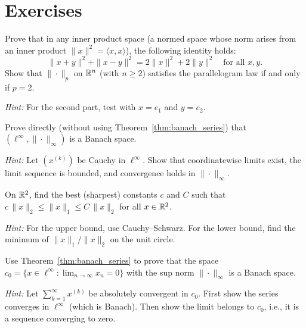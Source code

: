 \documentclass[11pt,a4paper]{article}
\begin{document}

\section{Exercises}
\label{sec:exercises}

\begin{exercise}
\label{ex:parallelogram}
Prove that in any inner product space (a normed space whose norm arises from
an inner product $\|x\|^2 = \langle x, x \rangle$), the following identity
holds:
\[
\|x + y\|^2 + \|x - y\|^2 = 2\|x\|^2 + 2\|y\|^2
\quad \text{for all } x, y.
\]
Show that $\|\cdot\|_p$ on $\mathbb{R}^n$ (with $n \ge 2$) satisfies the
parallelogram law if and only if $p = 2$.

\emph{Hint:} For the second part, test with $x = e_1$ and $y = e_2$.
\end{exercise}

\begin{exercise}
\label{ex:ell_inf_complete}
Prove directly (without using Theorem~\ref{thm:banach_series}) that
$(\ell^\infty, \|\cdot\|_\infty)$ is a Banach space.

\emph{Hint:} Let $(x^{(k)})$ be Cauchy in $\ell^\infty$. Show that
coordinatewise limits exist, the limit sequence is bounded, and convergence
holds in $\|\cdot\|_\infty$.
\end{exercise}

\begin{exercise}
\label{ex:norm_equiv_R2}
On $\mathbb{R}^2$, find the best (sharpest) constants $c$ and $C$ such that
$c \, \|x\|_2 \le \|x\|_1 \le C \, \|x\|_2$ for all $x \in \mathbb{R}^2$.

\emph{Hint:} For the upper bound, use Cauchy--Schwarz. For the lower bound,
find the minimum of $\|x\|_1 / \|x\|_2$ on the unit circle.
\end{exercise}

\begin{exercise}
\label{ex:banach_char}
Use Theorem~\ref{thm:banach_series} to prove that the space
$c_0 = \{x \in \ell^\infty : \lim_{n \to \infty} x_n = 0\}$ with the
sup norm $\|\cdot\|_\infty$ is a Banach space.

\emph{Hint:} Let $\sum_{k=1}^\infty x^{(k)}$ be absolutely convergent in
$c_0$. First show the series converges in $\ell^\infty$ (which is Banach).
Then show the limit belongs to $c_0$, i.e., it is a sequence converging to
zero.
\end{exercise}
\end{document}
